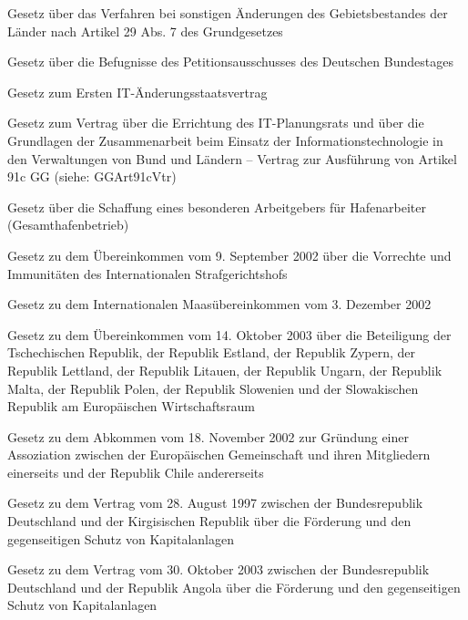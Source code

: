 \item[{GGArt29Abs7G}] Gesetz über das Verfahren bei sonstigen Änderungen des Gebietsbestandes der Länder nach Artikel 29 Abs. 7 des Grundgesetzes

\item[{GGArt45cG}] Gesetz über die Befugnisse des Petitionsausschusses des Deutschen Bundestages

\item[{GGArt91cÄndVtr1G}] Gesetz zum Ersten IT-Änderungsstaatsvertrag

\item[{GGArt91cVtrG}] Gesetz zum Vertrag über die Errichtung des IT-Planungsrats und über die Grundlagen der Zusammenarbeit beim Einsatz der Informationstechnologie in den Verwaltungen von Bund und Ländern – Vertrag zur Ausführung von Artikel 91c GG (siehe: GGArt91cVtr)

\item[{GHfBetrG}] Gesetz über die Schaffung eines besonderen Arbeitgebers für Hafenarbeiter (Gesamthafenbetrieb)

\item[{GII041138}] Gesetz zu dem Übereinkommen vom 9. September 2002 über die Vorrechte und Immunitäten des Internationalen Strafgerichtshofs

\item[{GII041181}] Gesetz zu dem Internationalen Maasübereinkommen vom 3. Dezember 2002

\item[{GII041202}] Gesetz zu dem Übereinkommen vom 14. Oktober 2003 über die Beteiligung der Tschechischen Republik, der Republik Estland, der Republik Zypern, der Republik Lettland, der Republik Litauen, der Republik Ungarn, der Republik Malta, der Republik Polen, der Republik Slowenien und der Slowakischen Republik am Europäischen Wirtschaftsraum

\item[{GII041730}] Gesetz zu dem Abkommen vom 18. November 2002 zur Gründung einer Assoziation zwischen der Europäischen Gemeinschaft und ihren Mitgliedern einerseits und der Republik Chile andererseits

\item[{GII050699}] Gesetz zu dem Vertrag vom 28. August 1997 zwischen der Bundesrepublik Deutschland und der Kirgisischen Republik über die Förderung und den gegenseitigen Schutz von Kapitalanlagen

\item[{GII050708}] Gesetz zu dem Vertrag vom 30. Oktober 2003 zwischen der Bundesrepublik Deutschland und der Republik Angola über die Förderung und den gegenseitigen Schutz von Kapitalanlagen

